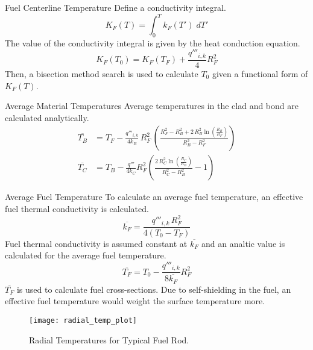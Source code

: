\begin{frame}{Fuel Centerline Temperature}
  Define a conductivity integral.
  \begin{equation}
    \label{eq:conductivity_integral}
    K_F(T) = \int_0^T k_F(T') \; dT'
  \end{equation}
  The value of the conductivity integral is given by the heat conduction
  equation.
  \begin{equation}
    \label{eq:tcl_conductivity_integral}
    K_F(T_0) = K_F(T_F) + \frac{q'''_{i,k}}{4} R_F^2
  \end{equation}
  Then, a bisection method search is used to calculate $T_0$ given a functional
  form of $K_F(T)$.
\end{frame}

\begin{frame}{Average Material Temperatures}
  Average temperatures in the clad and bond are calculated analytically.
  \begin{align}
    \label{eq:tb_bar}
    \overline{T_B} &= T_F - \frac{q'''_{i,k}}{4 k_B} \, R_F^2 \, \left(
      \frac{R_F^2 - R_B^2 + 2\,R_B^2 \ln\left(\frac{R_B}{R_F}\right)}
      {R_B^2-R_F^2}\right) \\
    \label{eq:tc_bar}
    \overline{T_C} &= T_B - \frac{q'''}{4 k_C} R_F^2 \left(
      \frac{2 \, R_C^2 \ln\left(\frac{R_C}{R_B}\right)}
      {R_C^2 - R_B^2}  - 1\right)
  \end{align}
\end{frame}

\begin{frame}{Average Fuel Temperature}
  To calculate an average fuel temperature, an effective fuel thermal
  conductivity is calculated.
  \begin{equation}
    \label{eq:kfuel_constant}
    \overline{k_F} = \frac{q'''_{i,k} \, R_F^2}{4(T_0-T_F)}
  \end{equation}
  Fuel thermal conductivity is assumed constant at $\overline{k_F}$ and an
  analtic value is calculated for the average fuel temperature.
  \begin{equation}
    \label{eq:tf_bar}
    \overline{T_F} = T_0 - \frac{q'''_{i,k}}{8 \overline{k_F}} R_F^2
  \end{equation}
  $\overline{T_F}$ is used to calculate fuel cross-sections. Due to
  self-shielding in the fuel, an effective fuel temperature would weight the
  surface temperature more.
\end{frame}

\begin{frame}
  \begin{figure}
    \centering
    \texttt{[image: radial\_temp\_plot]}
    \caption{Radial Temperatures for Typical Fuel Rod.}
    \label{fig:radial_temp_plot}
  \end{figure}
\end{frame}

